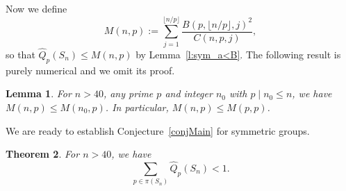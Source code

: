 \documentclass[11pt]{amsart}
\numberwithin{equation}{section}
\newtheorem{theorem}{Theorem}[section]
\newtheorem{lemma}[theorem]{Lemma}
\theoremstyle{definition}
\theoremstyle{remark}
\begin{document}

Now we define
\begin{equation*}
    M(n,p) := \sum_{j = 1}^{\lfloor n/p \rfloor} \frac{B(p,\lfloor n/p \rfloor,j)^2}{C(n,p,j)} ,
\end{equation*}
so that $\widehat{Q}_p(S_n) \leqslant M(n,p)$ by Lemma~\ref{l:sym_a<B}.
The following result is purely numerical and we omit its proof.

\begin{lemma}\label{l:sym_m_n}
    For $n>40$, any prime $p$ and integer $n_0$ with $p \mid n_0 \leqslant n$,
    we have $M(n,p) \leqslant M(n_0,p)$.
    In particular, $M(n,p) \leqslant M(p,p)$.
\end{lemma}

We are ready to establish Conjecture~\ref{conjMain} for symmetric groups.

\begin{theorem}\label{t:sym}
    For $n > 40$, we have
    \begin{equation*}
        \sum_{p\in\pi(S_n)} \widehat{Q}_p(S_n) < 1.
    \end{equation*}
\end{theorem}
\end{document}

